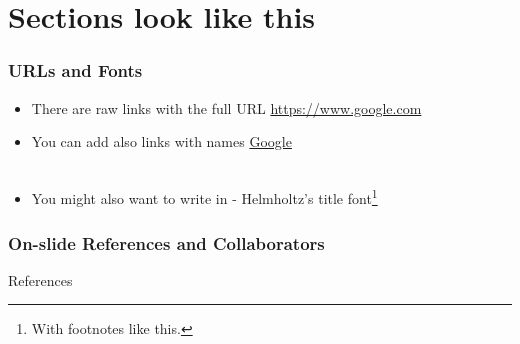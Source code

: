 \documentclass[aspectratio=1610]{beamer}
\begin{document}
\section{Sections look like this}


\begin{frame}
    \frametitle{URLs and Fonts}

    \begin{itemize}
        \item There are raw links with the full URL \url{https://www.google.com}
        \item You can add also links with names \href{https://www.google.com}{Google}\\~

        \item You might also want to write in  - Helmholtz's title font\footnote{With footnotes like this.}
    \end{itemize}
\end{frame}


\begin{frame}
    \frametitle{On-slide References and Collaborators}

\end{frame}


\begin{frame}[allowframebreaks]{References}
    \printbibliography
\end{frame}
\end{document}
